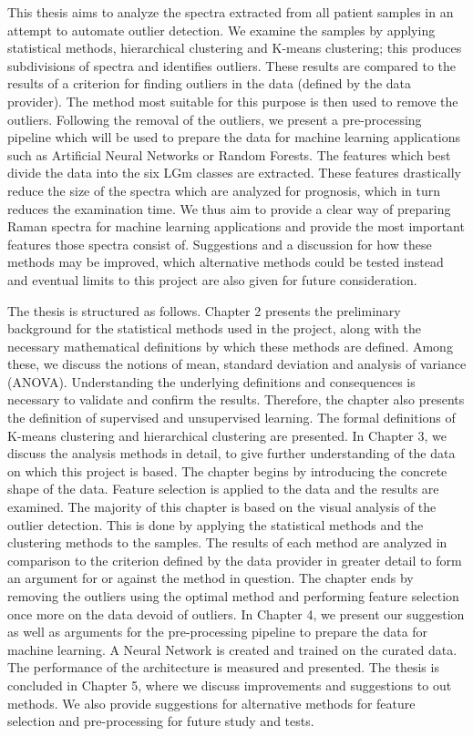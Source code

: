 This thesis aims to analyze the spectra extracted from all patient samples in an attempt to automate outlier detection.%
We examine the samples by applying statistical methods, hierarchical clustering and K-means clustering; this produces subdivisions of spectra and identifies outliers. These results are compared to the results of a criterion for finding outliers in the data (defined by the data provider). The method most suitable for this purpose is then used to remove the outliers. Following the removal of the outliers, we present a pre-processing pipeline which will be used to prepare the data for machine learning applications such as Artificial Neural Networks or Random Forests. The features which best divide the data into the six LGm classes are extracted. These features drastically reduce the size of the spectra which are analyzed for prognosis, which in turn reduces the examination time. We thus aim to provide a clear way of preparing Raman spectra for machine learning applications and provide the most important features those spectra consist of. Suggestions and a discussion for how these methods may be improved, which alternative methods could be tested instead and eventual limits to this project are also given for future consideration.

The thesis is structured as follows. Chapter 2 presents the preliminary background for the statistical methods used in the project, along with the necessary mathematical definitions by which these methods are defined. Among these, we discuss the notions of mean, standard deviation and analysis of variance (ANOVA). Understanding the underlying definitions and consequences is necessary to validate and confirm the results. Therefore, the chapter also presents the definition of supervised and unsupervised learning. The formal definitions of K-means clustering and hierarchical clustering are presented. In Chapter 3, we discuss the analysis methods in detail, to give further understanding of the data on which this project is based. The chapter begins by introducing the concrete shape of the data. Feature selection is applied to the data and the results are examined. The majority of this chapter is based on the visual analysis of the outlier detection. This is done by applying the statistical methods and the clustering methods to the samples. The results of each method are analyzed in comparison to the criterion defined by the data provider in greater detail to form an argument for or against the method in question. The chapter ends by removing the outliers using the optimal method and performing feature selection once more on the data devoid of outliers. In Chapter 4, we present our suggestion as well as arguments for the pre-processing pipeline to prepare the data for machine learning. A Neural Network is created and trained on the curated data. The performance of the architecture is measured and presented. The thesis is concluded in Chapter 5, where we discuss improvements and suggestions to out methods. We also provide suggestions for alternative methods for feature selection and pre-processing for future study and tests.